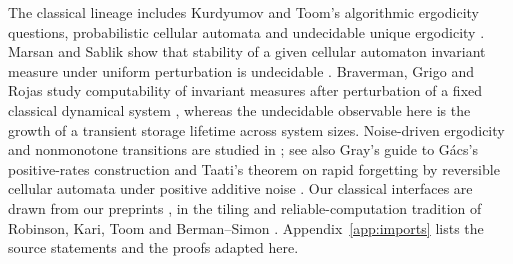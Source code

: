 The classical lineage includes Kurdyumov and Toom's algorithmic ergodicity questions, probabilistic cellular automata and undecidable unique ergodicity \cite{BMM2013,Kurdyumov1978,Toom2000,ToomContinuous2000,Torma2015}. Marsan and Sablik show that stability of a given cellular automaton invariant measure under uniform perturbation is undecidable \cite{MarsanSablik2024}. Braverman, Grigo and Rojas study computability of invariant measures after perturbation of a fixed classical dynamical system \cite{BravermanGrigoRojas2012}, whereas the undecidable observable here is the growth of a transient storage lifetime across system sizes. Noise-driven ergodicity and nonmonotone transitions are studied in \cite{MST2019,MarcoviciTaati2026,Marsan2025}; see also Gray's guide to G\'acs's positive-rates construction \cite{Gray2001} and Taati's theorem on rapid forgetting by reversible cellular automata under positive additive noise \cite{Taati2021}. Our classical interfaces are drawn from our preprints \cite{DMFixed2026,DMNoise2026,DMPhase2026}, in the tiling and reliable-computation tradition of Robinson, Kari, Toom and Berman--Simon \cite{BermanSimon1988,Kari1992,Robinson1971,Toom1980}. Appendix~\ref{app:imports} lists the source statements and the proofs adapted here.



